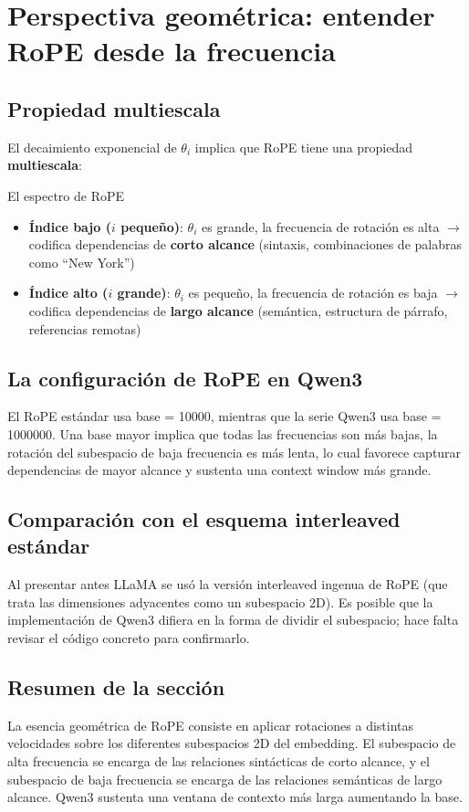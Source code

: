 \section{Perspectiva geométrica: entender RoPE desde la frecuencia}

\subsection{Propiedad multiescala}

El decaimiento exponencial de $\theta_i$ implica que RoPE tiene una propiedad \textbf{multiescala}:

\begin{importantbox}{El espectro de RoPE}
\begin{itemize}
  \item \textbf{Índice bajo ($i$ pequeño)}: $\theta_i$ es grande, la frecuencia de rotación es alta $\to$ codifica dependencias de \textbf{corto alcance} (sintaxis, combinaciones de palabras como ``New York'')
  \item \textbf{Índice alto ($i$ grande)}: $\theta_i$ es pequeño, la frecuencia de rotación es baja $\to$ codifica dependencias de \textbf{largo alcance} (semántica, estructura de párrafo, referencias remotas)
\end{itemize}
\end{importantbox}

\subsection{La configuración de RoPE en Qwen3}

El RoPE estándar usa base = 10000, mientras que la serie Qwen3 usa base = 1000000. Una base mayor implica que todas las frecuencias son más bajas, la rotación del subespacio de baja frecuencia es más lenta, lo cual favorece capturar dependencias de mayor alcance y sustenta una context window más grande.

\subsection{Comparación con el esquema interleaved estándar}

Al presentar antes LLaMA se usó la versión interleaved ingenua de RoPE (que trata las dimensiones adyacentes como un subespacio 2D). Es posible que la implementación de Qwen3 difiera en la forma de dividir el subespacio; hace falta revisar el código concreto para confirmarlo.

\subsection{Resumen de la sección}

La esencia geométrica de RoPE consiste en aplicar rotaciones a distintas velocidades sobre los diferentes subespacios 2D del embedding. El subespacio de alta frecuencia se encarga de las relaciones sintácticas de corto alcance, y el subespacio de baja frecuencia se encarga de las relaciones semánticas de largo alcance. Qwen3 sustenta una ventana de contexto más larga aumentando la base.
